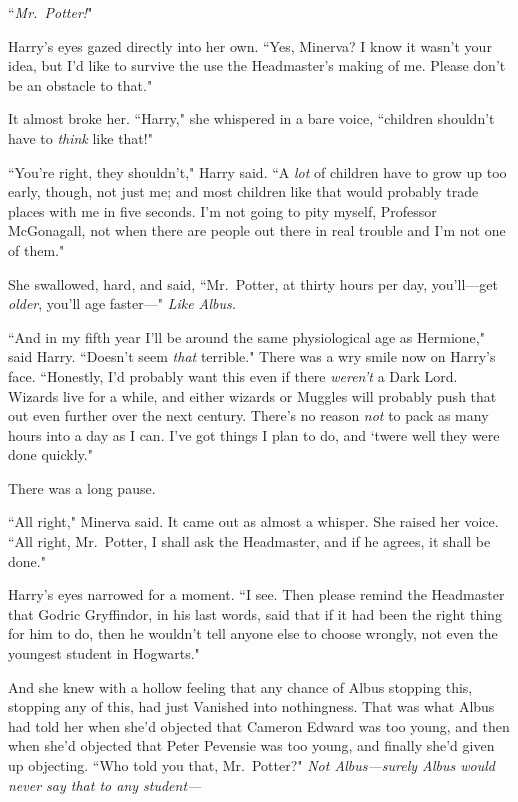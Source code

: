 ``\emph{Mr.~Potter!}"

Harry's eyes gazed directly into her own. ``Yes, Minerva? I know it wasn't your idea, but I'd like to survive the use the Headmaster's making of me. Please don't be an obstacle to that."

It almost broke her. ``Harry," she whispered in a bare voice, ``children shouldn't have to \emph{think} like that!"

``You're right, they shouldn't," Harry said. ``A \emph{lot} of children have to grow up too early, though, not just me; and most children like that would probably trade places with me in five seconds. I'm not going to pity myself, Professor McGonagall, not when there are people out there in real trouble and I'm not one of them."

She swallowed, hard, and said, ``Mr.~Potter, at thirty hours per day, you'll---get \emph{older}, you'll age faster---" \emph{Like Albus.}

``And in my fifth year I'll be around the same physiological age as Hermione," said Harry. ``Doesn't seem \emph{that} terrible." There was a wry smile now on Harry's face. ``Honestly, I'd probably want this even if there \emph{weren't} a Dark Lord. Wizards live for a while, and either wizards or Muggles will probably push that out even further over the next century. There's no reason \emph{not} to pack as many hours into a day as I can. I've got things I plan to do, and `twere well they were done quickly."

There was a long pause.

``All right," Minerva said. It came out as almost a whisper. She raised her voice. ``All right, Mr.~Potter, I shall ask the Headmaster, and if he agrees, it shall be done."

Harry's eyes narrowed for a moment. ``I see. Then please remind the Headmaster that Godric Gryffindor, in his last words, said that if it had been the right thing for him to do, then he wouldn't tell anyone else to choose wrongly, not even the youngest student in Hogwarts."

And she knew with a hollow feeling that any chance of Albus stopping this, stopping any of this, had just Vanished into nothingness. That was what Albus had told her when she'd objected that Cameron Edward was too young, and then when she'd objected that Peter Pevensie was too young, and finally she'd given up objecting. ``Who told you that, Mr.~Potter?" \emph{Not Albus---surely Albus would never \emph{say} that to any student---}

